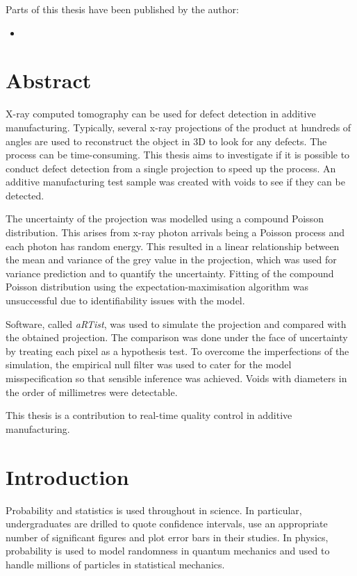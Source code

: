\documentclass[12pt, a4paper]{memoir}
\begin{document}
Parts of this thesis have been published by the author:
\begin{itemize}
  \item\nobibliography*{}
\end{itemize}

\chapter{Abstract}
X-ray computed tomography can be used for defect detection in additive manufacturing. Typically, several x-ray projections of the product at hundreds of angles are used to reconstruct the object in 3D to look for any defects. The process can be time-consuming. This thesis aims to investigate if it is possible to conduct defect detection from a single projection to speed up the process. An additive manufacturing test sample was created with voids to see if they can be detected.

The uncertainty of the projection was modelled using a compound Poisson distribution. This arises from x-ray photon arrivals being a Poisson process and each photon has random energy. This resulted in a linear relationship between the mean and variance of the grey value in the projection, which was used for variance prediction and to quantify the uncertainty. Fitting of the compound Poisson distribution using the expectation-maximisation algorithm was unsuccessful due to identifiability issues with the model.

Software, called \emph{aRTist}, was used to simulate the projection and compared with the obtained projection. The comparison was done under the face of uncertainty by treating each pixel as a hypothesis test.  To overcome the imperfections of the simulation, the empirical null filter was used to cater for the model misspecification so that sensible inference was achieved. Voids with diameters in the order of millimetres were detectable.

This thesis is a contribution to real-time quality control in additive manufacturing.

\newpage

\mainmatter

\chapter{Introduction}

Probability and statistics is used throughout in science. In particular, undergraduates are drilled to quote confidence intervals, use an appropriate number of significant figures and plot error bars in their studies. In physics, probability is used to model randomness in quantum mechanics and used to handle millions of particles in statistical mechanics.
\end{document}
